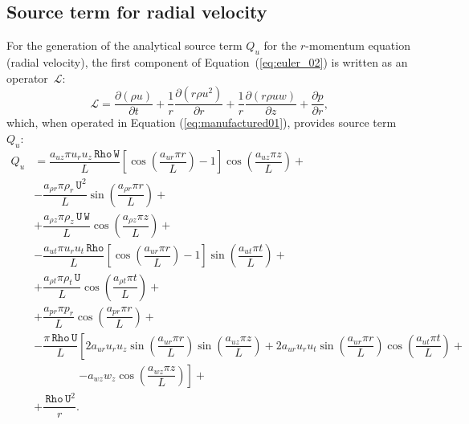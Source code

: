 \documentclass[10pt]{article}
\newcommand{\Diff}[2] {\dfrac{\partial( #1)}{\partial #2}}
\newcommand{\diff}[2] {\dfrac{\partial #1}{\partial #2}}
\newcommand{\Lo}{\,\mathcal{L}}
\newcommand{\Rho}{\,\mathtt{Rho}}
\newcommand{\U}{\,\mathtt{U}}
\newcommand{\W}{\,\mathtt{W}}
\begin{document}
\subsection{Source term for radial velocity}

For the generation of the analytical source term $Q_u$ for the $r$-momentum equation (radial velocity), the first component of Equation~(\ref{eq:euler_02}) is written as an  operator $\Lo$:
\begin{equation*}
 \Lo= \Diff{\rho u}{t} +\dfrac{1}{r}\Diff{r \rho u^2 }{r}+ \dfrac{1}{r}\Diff{r \rho u w}{z}+\diff{p}{r},
\end{equation*}
which, when operated in Equation (\ref{eq:manufactured01}), provides source term $Q_{u}$:
\begin{equation}
 \begin{split}
 \displaystyle
Q_u &=\dfrac{a_{uz} \pi u_r u_z \Rho \W }{L} \left[\cos\left(\dfrac{a_{ur} \pi r}{L}\right)-1\right] \cos\left(\dfrac{a_{uz} \pi z}{L}\right)+ \\
&-\dfrac{a_{\rho r} \pi \rho_r \U^2 }{L}\sin\left(\dfrac{a_{\rho r} \pi r}{L}\right)+ \\
&+\dfrac{a_{\rho z} \pi \rho_z \U \W }{L}\cos\left(\dfrac{a_{\rho z} \pi z}{L}\right)+ \\
&-\dfrac{a_{ut} \pi u_r u_t \Rho}{L}\left[\cos\left(\dfrac{a_{ur} \pi r}{L}\right)-1\right]  \sin\left(\dfrac{a_{ut} \pi t}{L}\right)+ \\
&+\dfrac{a_{\rho t} \pi \rho_t \U }{L}\cos\left(\dfrac{a_{\rho t} \pi t}{L}\right)+ \\
&+\dfrac{a_{pr} \pi p_r }{L}\cos\left(\dfrac{a_{pr} \pi r}{L}\right)+ \\
&-\dfrac{\pi \Rho \U}{L}\left[2 a_{ur} u_r u_z \sin\left(\dfrac{a_{ur} \pi r}{L}\right) \sin\left(\dfrac{a_{uz} \pi z}{L}\right)+2 a_{ur} u_r u_t \sin\left(\dfrac{a_{ur} \pi r}{L}\right) \cos\left(\dfrac{a_{ut} \pi t}{L}\right)\right.+\\
    &\qquad\qquad\left.-a_{wz} w_z \cos\left(\dfrac{a_{wz} \pi z}{L}\right)\right] + \\
&+\dfrac{\Rho \U^2}{r}.
\end{split}
\end{equation}
%
\end{document}
